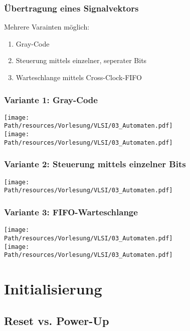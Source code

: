 	\subsubsection{Übertragung eines Signalvektors}
	Mehrere Varainten möglich:
	\begin{enumerate}
		\item Gray-Code
		\item Steuerung mittels einzelner, seperater Bits
		\item Warteschlange mittels Cross-Clock-FIFO
	\end{enumerate}
	
	\subsubsection{Variante 1: Gray-Code}
		\texttt{[image: \\Path/resources/Vorlesung/VLSI/03\_Automaten.pdf]}\\
		\texttt{[image: \\Path/resources/Vorlesung/VLSI/03\_Automaten.pdf]}
		
	\subsubsection{Variante 2: Steuerung mittels einzelner Bits}
		\texttt{[image: \\Path/resources/Vorlesung/VLSI/03\_Automaten.pdf]}
		
	\subsubsection{Variante 3: FIFO-Warteschlange}
		\texttt{[image: \\Path/resources/Vorlesung/VLSI/03\_Automaten.pdf]}\\
		
		\texttt{[image: \\Path/resources/Vorlesung/VLSI/03\_Automaten.pdf]}
		
		
		
		
		
\section{Initialisierung}
	
\subsection{Reset vs. Power-Up}
